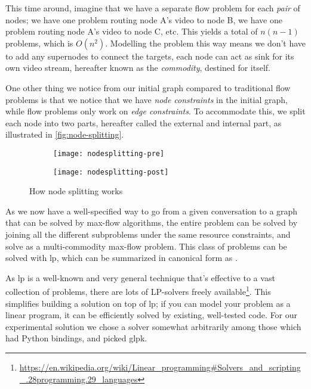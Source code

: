 This time around, imagine that we have a separate flow problem for each \emph{pair} of nodes; we have one problem routing node A's video to node B, we have one problem routing node A's video to node C, etc. This yields a total of $n(n-1)$ problems, which is $O(n^2)$. Modelling the problem this way means we don't have to add any supernodes to connect the targets, each node can act as sink for its own video stream, hereafter known as the \emph{commodity}, destined for itself.

One other thing we notice from our initial graph compared to traditional flow problems is that we notice that we have \emph{node constraints} in the initial graph, while flow problems only work on \emph{edge constraints}. To accommodate this, we split each node into two parts, hereafter called the external and internal part, as illustrated in \autoref{fig:node-splitting}.

\begin{figure}
    \centering
    \begin{subfigure}[t]{.48\textwidth}
        \centering
        \texttt{[image: nodesplitting-pre]}
    \end{subfigure}
    \hfill
    \begin{subfigure}[t]{.48\textwidth}
        \centering
        \texttt{[image: nodesplitting-post]}
    \end{subfigure}
    \caption{How node splitting works}
    \label{fig:node-splitting}
\end{figure}

As we now have a well-specified way to go from a given conversation to a graph that can be solved by max-flow algorithms, the entire problem can be solved by joining all the different subproblems under the same resource constraints, and solve as a multi-commodity max-flow problem. This class of problems can be solved with \gls{lp}, which can be summarized in canonical form as .

As \gls{lp} is a well-known and very general technique that's effective to a vast collection of problems, there are lots of LP-solvers freely available\footnote{\url{https://en.wikipedia.org/wiki/Linear_programming\#Solvers_and_scripting_.28programming.29_languages}}. This simplifies building a solution on top of \gls{lp}; if you can model your problem as a linear program, it can be efficiently solved by existing, well-tested code. For our experimental solution we chose a solver somewhat arbitrarily among those which had Python bindings, and picked \gls{glpk}.


